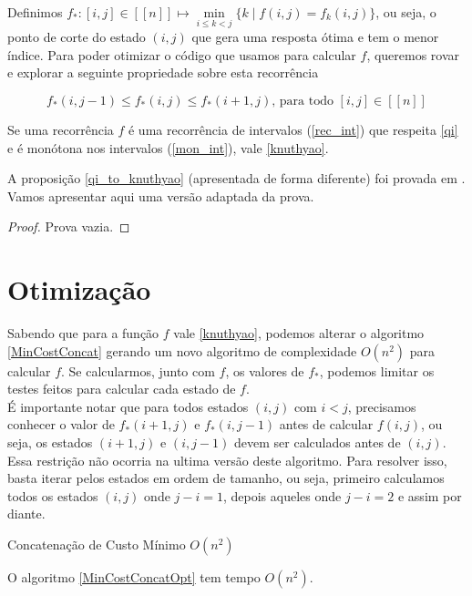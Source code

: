 Definimos $f_* : [i,j] \in [[n]] \mapsto \min\limits_{i \leq k < j} \Big\{ k \mid f(i,j) = f_k(i,j) \Big\}$, ou seja, o ponto de corte do estado $(i,j)$ que gera uma resposta ótima e tem o menor índice. Para poder otimizar o código que usamos para calcular $f$, queremos rovar e explorar a seguinte propriedade sobre esta recorrência

\begin{equation} \label{knuthyao}
f_*(i,j-1) \leq f_*(i,j) \leq f_*(i+1,j) \text{, para todo } [i,j] \in [[n]]
\end{equation}

\begin{prop} \label{qi_to_knuthyao}
Se uma recorrência $f$ é uma recorrência de intervalos (\ref{rec_int}) que respeita \ref{qi} e é monótona nos intervalos (\ref{mon_int}), vale \ref{knuthyao}.
\end{prop}

A proposição \ref{qi_to_knuthyao} (apresentada de forma diferente) foi provada em \cite{Yao:1980}. Vamos apresentar aqui uma versão adaptada da prova.

\begin{proof}
Prova vazia.
\end{proof}

\section{Otimização}

Sabendo que para a função $f$ vale \ref{knuthyao}, podemos alterar o algoritmo \ref{MinCostConcat} gerando um novo algoritmo de complexidade $O(n^2)$ para calcular $f$. Se calcularmos, junto com $f$, os valores de $f_*$, podemos limitar os testes feitos para calcular cada estado de $f$. \\
É importante notar que para todos estados $(i,j)$ com $i < j$, precisamos conhecer o valor de $f_*(i+1, j)$ e $f_*(i,j-1)$ antes de calcular $f(i,j)$, ou seja, os estados $(i+1,j)$ e $(i,j-1)$ devem ser calculados antes de $(i,j)$. Essa restrição não ocorria na ultima versão deste algoritmo. Para resolver isso, basta iterar pelos estados em ordem de tamanho, ou seja, primeiro calculamos todos os estados $(i,j)$ onde $j-i = 1$, depois aqueles onde $j-i = 2$ e assim por diante.

\begin{algorithm}
\caption{Concatenação de Custo Mínimo $O(n^2)$}
\label{MinCostConcatOpt}
\begin{algorithmic}[1]
\State \Return {}
\end{algorithmic}
\end{algorithm}

\begin{prop}
O algoritmo \ref{MinCostConcatOpt} tem tempo $O(n^2)$.
\end{prop}
